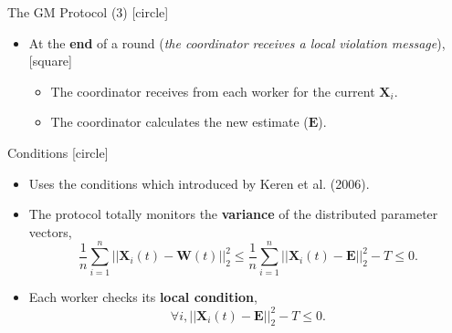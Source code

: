 \begin{frame}{The GM Protocol (3)}
    [circle]
    \begin{itemize}
        \item{At the \textbf{end} of a round (\emph{the coordinator receives a local violation message}),
        \vspace{0.2cm}
        [square]
        \begin{itemize}
            \item{The coordinator receives from each worker for the current $\pmb{X}_i$.}
            \vspace{0.3cm}
            \item{The coordinator calculates the new estimate ($\pmb{E}$).}
        \end{itemize}
        }
    \end{itemize}
\end{frame}

\begin{frame}{Conditions}
    [circle]
    \begin{itemize}
        \item{Uses the conditions which introduced by Keren et al. (2006).}
        \vspace{0.4cm}
        \item{The protocol totally monitors the \textbf{variance} of the distributed parameter vectors,
        \[\frac{1}{n}\sum_{i=1}^n||\pmb{X}_i(t)-\pmb{W}(t)||_2^2 \leq \frac{1}{n}\sum_{i=1}^n||\pmb{X}_i(t)-\pmb{E}||_2^2 - T \leq 0.\]}
        \vspace{-0.4cm}
        \item{Each worker checks its \textbf{local condition},
        \[\forall i,||\pmb{X}_i(t)-\pmb{E}||_2^2 - T \leq 0.\]}
    \end{itemize}
\end{frame}